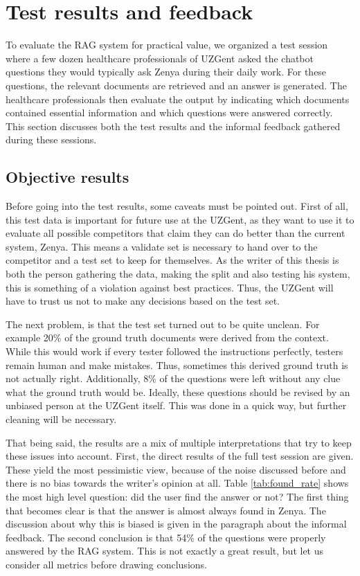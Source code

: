\section{Test results and feedback}
\label{sec:uzgent_test_results_and_feedback}
To evaluate the RAG system for practical value, we organized a test session where a few dozen healthcare professionals of UZGent asked the chatbot questions they would typically ask Zenya during their daily work. For these questions, the relevant documents are retrieved and an answer is generated. The healthcare professionals then evaluate the output by indicating which documents contained essential information and which questions were answered correctly. This section discusses both the test results and the informal feedback gathered during these sessions.

\subsection{Objective results}
Before going into the test results, some caveats must be pointed out. First of all, this test data is important for future use at the UZGent, as they want to use it to evaluate all possible competitors that claim they can do better than the current system, Zenya. This means a validate set is necessary to hand over to the competitor and a test set to keep for themselves. As the writer of this thesis is both the person gathering the data, making the split and also testing his system, this is something of a violation against best practices. Thus, the UZGent will have to trust us not to make any decisions based on the test set.

The next problem, is that the test set turned out to be quite unclean. For example 20\% of the ground truth documents were derived from the context. While this would work if every tester followed the instructions perfectly, testers remain human and make mistakes. Thus, sometimes this derived ground truth is not actually right. Additionally, 8\% of the questions were left without any clue what the ground truth would be. Ideally, these questions should be revised by an unbiased person at the UZGent itself. This was done in a quick way, but further cleaning will be necessary.

That being said, the results are a mix of multiple interpretations that try to keep these issues into account. First, the direct results of the full test session are given. These yield the most pessimistic view, because of the noise discussed before and there is no bias towards the writer's opinion at all. Table \ref{tab:found_rate} shows the most high level question: did the user find the answer or not? The first thing that becomes clear is that the answer is almost always found in Zenya. The discussion about why this is biased is given in the paragraph about the informal feedback. The second conclusion is that 54\% of the questions were properly answered by the RAG system. This is not exactly a great result, but let us consider all metrics before drawing conclusions. 

